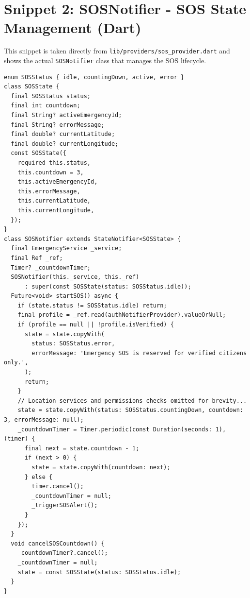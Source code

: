 \documentclass[12pt, a4paper, twoside]{report}
\begin{document}
\section*{Snippet 2: SOSNotifier - SOS State Management (Dart)}
This snippet is taken directly from \texttt{lib/providers/sos\_provider.dart} and shows the actual \texttt{SOSNotifier} class that manages the SOS lifecycle.
\begin{footnotesize}
\begin{verbatim}
enum SOSStatus { idle, countingDown, active, error }
class SOSState {
  final SOSStatus status;
  final int countdown;
  final String? activeEmergencyId;
  final String? errorMessage;
  final double? currentLatitude;
  final double? currentLongitude;
  const SOSState({
    required this.status,
    this.countdown = 3,
    this.activeEmergencyId,
    this.errorMessage,
    this.currentLatitude,
    this.currentLongitude,
  });
}
class SOSNotifier extends StateNotifier<SOSState> {
  final EmergencyService _service;
  final Ref _ref;
  Timer? _countdownTimer;
  SOSNotifier(this._service, this._ref)
      : super(const SOSState(status: SOSStatus.idle));
  Future<void> startSOS() async {
    if (state.status != SOSStatus.idle) return;
    final profile = _ref.read(authNotifierProvider).valueOrNull;
    if (profile == null || !profile.isVerified) {
      state = state.copyWith(
        status: SOSStatus.error,
        errorMessage: 'Emergency SOS is reserved for verified citizens only.',
      );
      return;
    }
    // Location services and permissions checks omitted for brevity...
    state = state.copyWith(status: SOSStatus.countingDown, countdown: 3, errorMessage: null);
    _countdownTimer = Timer.periodic(const Duration(seconds: 1), (timer) {
      final next = state.countdown - 1;
      if (next > 0) {
        state = state.copyWith(countdown: next);
      } else {
        timer.cancel();
        _countdownTimer = null;
        _triggerSOSAlert();
      }
    });
  }
  void cancelSOSCountdown() {
    _countdownTimer?.cancel();
    _countdownTimer = null;
    state = const SOSState(status: SOSStatus.idle);
  }
}
\end{verbatim}
\end{footnotesize}
\vspace{1cm}
\end{document}
